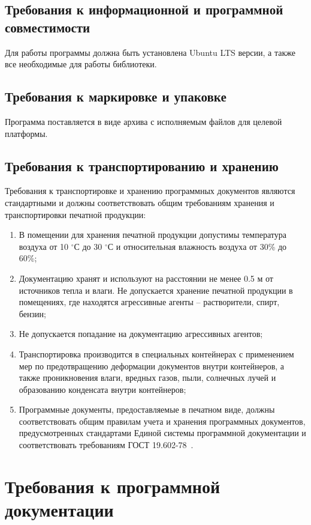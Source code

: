 \documentclass[techtask]{espd}
\begin{document}
\subsection{Требования к информационной и программной совместимости}
Для работы программы должна быть установлена Ubuntu LTS версии, а также все необходимые для работы библиотеки.

\subsection{Требования к маркировке и упаковке}
Программа поставляется в виде архива с исполняемым файлов для целевой платформы.

\subsection{Требования к транспортированию и хранению}
Требования к транспортировке и хранению программных документов являются стандартными и должны соответствовать общим требованиям хранения и транспортировки печатной продукции:

\begin{enumerate}
\item В помещении для хранения печатной продукции допустимы температура воздуха от 10 $^\circ$С до 30 $^\circ$С и относительная влажность воздуха от 30\% до 60\%;
\item Документацию хранят и используют на расстоянии не менее 0.5 м от источников тепла и влаги. Не допускается хранение печатной продукции в помещениях, где находятся агрессивные агенты – растворители, спирт, бензин;
\item Не допускается попадание на документацию агрессивных агентов;
\item Транспортировка производится в специальных контейнерах с применением мер по предотвращению деформации документов внутри контейнеров, а также проникновения влаги, вредных газов, пыли, солнечных лучей и образованию конденсата внутри контейнеров;
\item Программные документы, предоставляемые в печатном виде, должны соответствовать общим правилам учета и хранения программных документов, предусмотренных стандартами Единой системы программной документации и соответствовать требованиям ГОСТ 19.602-78~\cite{espd602}.
\end{enumerate}

\section{Требования к программной документации}
\end{document}
